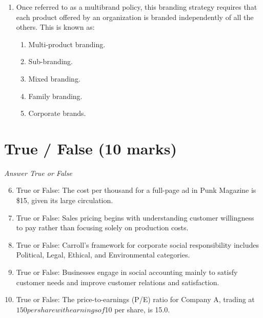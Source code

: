 \documentclass[12pt]{article}
\begin{document}
\begin{enumerate}[label=\arabic*.]
\begin{enumerate}[label=(\alph*)]
    \item 19.00
    \item 20.35
    \item 25.40
    \item 23.50
    \item 24.75
\end{enumerate}
\item Once referred to as a multibrand policy, this branding strategy requires that each product offered by an organization is branded independently of all the others. This is known as:
\begin{enumerate}[label=(\alph*)]
    \item Multi-product branding.
    \item Sub-branding.
    \item Mixed branding.
    \item Family branding.
    \item Corporate brands.
\end{enumerate}
\end{enumerate}

\section*{True / False (10 marks)}
\textit{Answer True or False}
\begin{enumerate}[label=\arabic*.]
\setcounter{enumi}{5}
\item True or False: The cost per thousand for a full-page ad in Punk Magazine is \$15, given its large circulation.
\item True or False: Sales pricing begins with understanding customer willingness to pay rather than focusing solely on production costs.
\item True or False: Carroll's framework for corporate social responsibility includes Political, Legal, Ethical, and Environmental categories.
\item True or False: Businesses engage in social accounting mainly to satisfy customer needs and improve customer relations and satisfaction.
\item True or False: The price-to-earnings (P/E) ratio for Company A, trading at $150 per share with earnings of $10 per share, is 15.0.
\end{enumerate}
\end{document}
